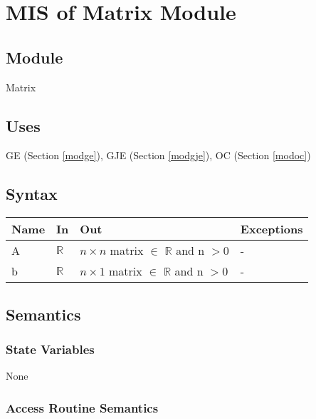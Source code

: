 \documentclass[12pt, titlepage]{article}
\begin{document}
\newpage


\section{MIS of {Matrix Module}} \label{modmatrix} %

\subsection{Module}

Matrix


\subsection{Uses}
GE (Section \ref{modge}), GJE (Section \ref{modgje}), OC (Section \ref{modoc})


\subsection{Syntax}

\begin{center}
\begin{tabular}{p{2cm} p{4cm} p{4cm} p{2cm}}
\hline
\textbf{Name} & \textbf{In} & \textbf{Out} & \textbf{Exceptions} \\
\hline
A & $\mathbb{R}$ & $n \times n$ matrix $\in$ $\mathbb{R}$ and n $> 0$ & - \\
b & $\mathbb{R}$ & $n \times 1$ matrix $\in$ $\mathbb{R}$ and n $> 0$ & - \\
\hline
\end{tabular}
\end{center}

\subsection{Semantics}

\subsubsection{State Variables}

None

\subsubsection{Access Routine Semantics}
\end{document}
